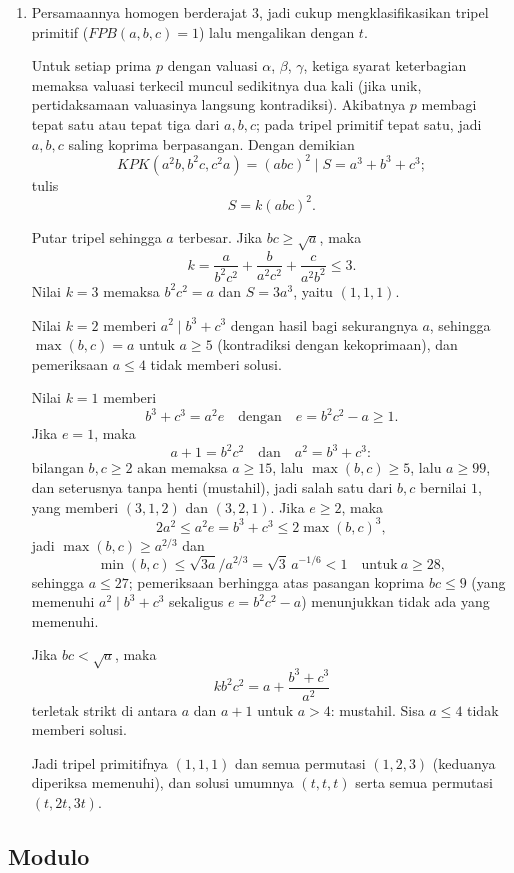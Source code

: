 \documentclass[12pt]{scrartcl}
\begin{document}
\begin{enumerate}[resume]
	\item Persamaannya homogen berderajat $3$, jadi cukup mengklasifikasikan
	tripel primitif ($FPB(a, b, c) = 1$) lalu mengalikan dengan $t$.

	Untuk setiap prima $p$ dengan valuasi $\alpha$, $\beta$, $\gamma$,
	ketiga syarat keterbagian memaksa valuasi terkecil muncul sedikitnya dua kali
	(jika unik, pertidaksamaan valuasinya langsung kontradiksi).
	Akibatnya $p$ membagi tepat satu atau tepat tiga dari $a, b, c$;
	pada tripel primitif tepat satu, jadi $a, b, c$ saling koprima berpasangan.
	Dengan demikian
	\[ KPK(a^2b, b^2c, c^2a) = (abc)^2 \mid S = a^3 + b^3 + c^3; \]
	tulis
	\[ S = k(abc)^2. \]

	Putar tripel sehingga $a$ terbesar.
	Jika $bc \ge \sqrt{a}$, maka
	\[ k = \frac{a}{b^2c^2} + \frac{b}{a^2c^2} + \frac{c}{a^2b^2} \le 3. \]
	Nilai $k = 3$ memaksa $b^2c^2 = a$ dan $S = 3a^3$, yaitu $(1, 1, 1)$.

	Nilai $k = 2$ memberi $a^2 \mid b^3 + c^3$ dengan hasil bagi sekurangnya $a$,
	sehingga $\max(b, c) = a$ untuk $a \ge 5$ (kontradiksi dengan kekoprimaan),
	dan pemeriksaan $a \le 4$ tidak memberi solusi.

	Nilai $k = 1$ memberi
	\[ b^3 + c^3 = a^2e \quad \text{dengan} \quad e = b^2c^2 - a \ge 1. \]
	Jika $e = 1$, maka
	\[ a + 1 = b^2c^2 \quad \text{dan} \quad a^2 = b^3 + c^3: \]
	bilangan $b, c \ge 2$ akan memaksa $a \ge 15$, lalu $\max(b,c) \ge 5$,
	lalu $a \ge 99$, dan seterusnya tanpa henti (mustahil),
	jadi salah satu dari $b, c$ bernilai $1$, yang memberi $(3, 1, 2)$ dan $(3, 2, 1)$.
	Jika $e \ge 2$, maka
	\[ 2a^2 \le a^2e = b^3 + c^3 \le 2\max(b,c)^3, \]
	jadi $\max(b,c) \ge a^{2/3}$ dan
	\[ \min(b, c) \le \sqrt{3a}/a^{2/3} = \sqrt{3}\,a^{-1/6} < 1 \quad \text{untuk} \ a \ge 28, \]
	sehingga $a \le 27$; pemeriksaan berhingga atas pasangan koprima $bc \le 9$
	(yang memenuhi $a^2 \mid b^3 + c^3$ sekaligus $e = b^2c^2 - a$)
 menunjukkan tidak ada yang memenuhi.

	Jika $bc < \sqrt{a}$, maka
	\[ kb^2c^2 = a + \frac{b^3+c^3}{a^2} \]
	terletak strikt di antara $a$ dan $a + 1$ untuk $a > 4$: mustahil.
	Sisa $a \le 4$ tidak memberi solusi.

	Jadi tripel primitifnya $(1, 1, 1)$ dan semua permutasi $(1, 2, 3)$
	(keduanya diperiksa memenuhi), dan solusi umumnya
	$(t, t, t)$ serta semua permutasi $(t, 2t, 3t)$.
\end{enumerate}

\subsection{Modulo}
\end{document}

